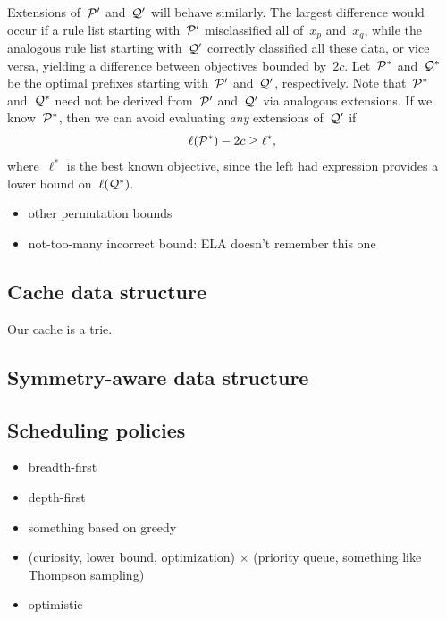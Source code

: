 Extensions of~$\cal P'$ and~$\cal Q'$ will behave similarly.
%
The largest difference would occur if a rule list starting with~$\cal P'$
misclassified all of~$x_p$ and~$x_q$, while the analogous rule list starting
with~$\cal Q'$ correctly classified all these data, or vice versa,
yielding a difference between objectives bounded by~$2c$.
%
Let~$\cal P^*$ and~$\cal Q^*$ be the optimal prefixes
starting with~$\cal P'$ and~$\cal Q'$, respectively.
%
Note that~$\cal P^*$ and~$\cal Q^*$ need not be derived from~$\cal P'$ and~$\cal Q'$
via analogous extensions.
%
If we know~$\cal P^*$, then we can avoid evaluating \emph{any} extensions of~$\cal Q'$ if
\begin{align}
\ell(\Prefix^*) - 2 c \ge \ell^*,
\end{align}
where~$\ell^*$ is the best known objective, since the left had expression
provides a lower bound on~$\ell(\cal{Q}^*)$.


\begin{itemize}
\item other permutation bounds
\item not-too-many incorrect bound:  ELA doesn't remember this one
\end{itemize}

\subsection{Cache data structure}
\label{sec:cache}

Our cache is a trie.

\subsection{Symmetry-aware data structure}

\subsection{Scheduling policies}

\begin{itemize}
\item breadth-first
\item depth-first
\item something based on greedy
\item (curiosity, lower bound, optimization) $\times$ (priority queue, something like Thompson sampling)
\item optimistic
\end{itemize}

